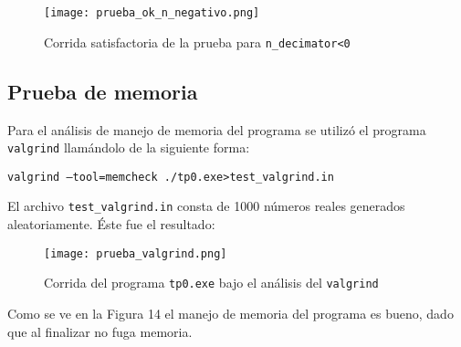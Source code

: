 	\begin{figure}[H]
		\centering
		\texttt{[image: prueba\_ok\_n\_negativo.png]}
		\label{graf:ok_n_negativo}
		\caption{Corrida satisfactoria de la prueba para \texttt{n\_decimator<0}}
	\end{figure}
	
\subsection{Prueba de memoria}

	Para el análisis de manejo de memoria del programa se utilizó el programa \texttt{valgrind} llamándolo de la siguiente forma:
		\begin{center}
			\texttt{valgrind --tool=memcheck ./tp0.exe>test\_valgrind.in}
		\end{center}
	
	El archivo \texttt{test\_valgrind.in} consta de 1000 números reales generados aleatoriamente. Éste fue el resultado:
		\begin{figure}[H]
			\centering
			\texttt{[image: prueba\_valgrind.png]}
			\label{graf:valgrind}
			\caption{Corrida del programa \texttt{tp0.exe} bajo el análisis del \texttt{valgrind}}
		\end{figure}
	
	Como se ve en la Figura 14 el manejo de memoria del programa es bueno, dado que al finalizar no fuga memoria.
